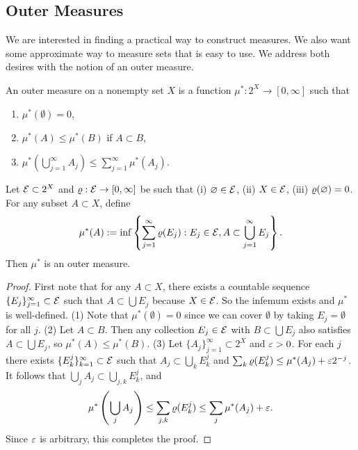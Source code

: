 \documentclass[12pt]{article} %
\begin{document}
\subsection{Outer Measures}

We are interested in finding a practical way to construct measures. We also want some approximate way to measure sets that is easy to use. We address both desires with the notion of an outer measure.

\begin{definition}
    An outer measure on a nonempty set $X$ is a function $\mu^* : 2^X \to [0,\infty]$ such that \begin{enumerate}
        \item $\mu^*(\emptyset) = 0$,
        \item $\mu^*(A) \leq \mu^*(B)$ if $A \subset B$,
        \item $\mu^*\left(\bigcup_{j=1}^{\infty} A_j\right) \leq \sum_{j=1}^{\infty} \mu^*(A_j)$.
    \end{enumerate}
\end{definition}

\begin{proposition}
    Let $\mathcal{E} \subset 2^X$ and $\varrho : \mathcal{E} \to [0, \infty]$ be such that (i) $\varnothing \in \mathcal{E}$, (ii) $X \in \mathcal{E}$, (iii) $\varrho(\varnothing) = 0$. For any subset $A \subset X$, define \[\mu^*(A) := \inf \left\{\sum_{j=1}^{\infty}\varrho(E_j) : E_j \in \mathcal{E}, A \subset \bigcup_{j=1}^{\infty}E_j\right\}.\] Then $\mu^*$ is an outer measure.
\end{proposition}

\begin{proof}
    First note that for any $A \subset X$, there exists a countable sequence $\{E_j\}_{j=1}^{\infty} \subset \mathcal{E}$ such that $A \subset \bigcup E_j$ because $X \in \mathcal{E}$. So the infemum exists and $\mu^*$ is well-defined. (1) Note that $\mu^*(\emptyset) = 0$ since we can cover $\emptyset$ by taking $E_j = \emptyset$ for all $j$. (2) Let $A \subset B$. Then any collection $E_j \in \mathcal{E}$ with $B \subset \bigcup E_j$ also satisfies $A \subset \bigcup E_j$, so $\mu^*(A) \leq \mu^*(B)$. (3) Let $\{A_j\}_{j=1}^{\infty} \subset 2^X$ and $\varepsilon > 0$. For each $j$ there exists $\{E^j_k\}_{k=1}^{\infty} \subset \mathcal{E}$ such that $A_j \subset \bigcup_k E^j_k$ and $\sum_{k} \varrho(E_k^j) \leq \mu^*(A_j) + \varepsilon{2^{-j}}$. It follows that $\bigcup_j A_j \subset \bigcup_{j,k} E^j_k$, and \[\mu^*\left(\bigcup_j A_j\right) \leq \sum_{j, k} \varrho(E^j_k) \leq \sum_j \mu^*(A_j) + \varepsilon.\] Since $\varepsilon$ is arbitrary, this completes the proof.
\end{proof}
\end{document}
